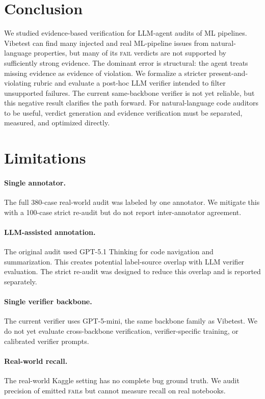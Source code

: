\documentclass[11pt]{article}
\begin{document}
\section{Conclusion}

We studied evidence-based verification for LLM-agent audits of ML pipelines.
Vibetest can find many injected and real ML-pipeline issues from natural-language properties, but many of its \textsc{fail} verdicts are not supported by sufficiently strong evidence.
The dominant error is structural: the agent treats missing evidence as evidence of violation.
We formalize a stricter present-and-violating rubric and evaluate a post-hoc LLM verifier intended to filter unsupported failures.
The current same-backbone verifier is not yet reliable, but this negative result clarifies the path forward.
For natural-language code auditors to be useful, verdict generation and evidence verification must be separated, measured, and optimized directly.

\section*{Limitations}

\paragraph{Single annotator.}
The full 380-case real-world audit was labeled by one annotator.
We mitigate this with a 100-case strict re-audit but do not report inter-annotator agreement.

\paragraph{LLM-assisted annotation.}
The original audit used GPT-5.1 Thinking for code navigation and summarization.
This creates potential label-source overlap with LLM verifier evaluation.
The strict re-audit was designed to reduce this overlap and is reported separately.

\paragraph{Single verifier backbone.}
The current verifier uses GPT-5-mini, the same backbone family as Vibetest.
We do not yet evaluate cross-backbone verification, verifier-specific training, or calibrated verifier prompts.

\paragraph{Real-world recall.}
The real-world Kaggle setting has no complete bug ground truth.
We audit precision of emitted \textsc{fail}s but cannot measure recall on real notebooks.
\end{document}
